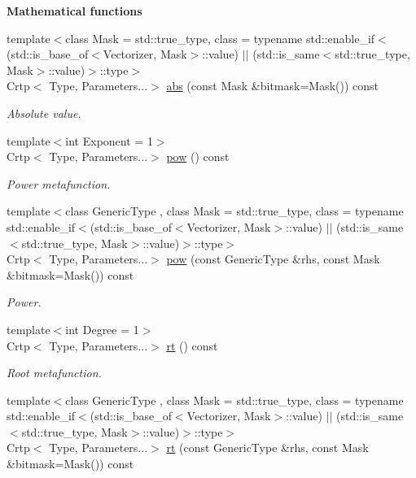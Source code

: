 \begin{Indent}{\bf Mathematical functions}\par
\begin{DoxyCompactItemize}
\item 
{\footnotesize template$<$class Mask  = std\-::true\-\_\-type, class  = typename std\-::enable\-\_\-if$<$(std\-::is\-\_\-base\-\_\-of$<$\-Vectorizer, Mask$>$\-::value) $|$$|$ (std\-::is\-\_\-same$<$std\-::true\-\_\-type, Mask$>$\-::value)$>$\-::type$>$ }\\Crtp$<$ Type, Parameters...$>$ \hyperlink{classmagrathea_1_1AbstractNArray_ac31ef0d0956a0a076f8fb47c98af4eaa}{abs} (const Mask \&bitmask=Mask()) const 
\begin{DoxyCompactList}\small\item\em Absolute value. \end{DoxyCompactList}\item 
{\footnotesize template$<$int Exponent = 1$>$ }\\Crtp$<$ Type, Parameters...$>$ \hyperlink{classmagrathea_1_1AbstractNArray_a502edc22924d0096c7929a9490174f81}{pow} () const 
\begin{DoxyCompactList}\small\item\em Power metafunction. \end{DoxyCompactList}\item 
{\footnotesize template$<$class Generic\-Type , class Mask  = std\-::true\-\_\-type, class  = typename std\-::enable\-\_\-if$<$(std\-::is\-\_\-base\-\_\-of$<$\-Vectorizer, Mask$>$\-::value) $|$$|$ (std\-::is\-\_\-same$<$std\-::true\-\_\-type, Mask$>$\-::value)$>$\-::type$>$ }\\Crtp$<$ Type, Parameters...$>$ \hyperlink{classmagrathea_1_1AbstractNArray_ad3097e7e24f9c1a2cfbaacef90da781e}{pow} (const Generic\-Type \&rhs, const Mask \&bitmask=Mask()) const 
\begin{DoxyCompactList}\small\item\em Power. \end{DoxyCompactList}\item 
{\footnotesize template$<$int Degree = 1$>$ }\\Crtp$<$ Type, Parameters...$>$ \hyperlink{classmagrathea_1_1AbstractNArray_ac09fe9cfa8c3aa117fe860ec61ed8921}{rt} () const 
\begin{DoxyCompactList}\small\item\em Root metafunction. \end{DoxyCompactList}\item 
{\footnotesize template$<$class Generic\-Type , class Mask  = std\-::true\-\_\-type, class  = typename std\-::enable\-\_\-if$<$(std\-::is\-\_\-base\-\_\-of$<$\-Vectorizer, Mask$>$\-::value) $|$$|$ (std\-::is\-\_\-same$<$std\-::true\-\_\-type, Mask$>$\-::value)$>$\-::type$>$ }\\Crtp$<$ Type, Parameters...$>$ \hyperlink{classmagrathea_1_1AbstractNArray_a164906d4dc4c247201578fe4a917a471}{rt} (const Generic\-Type \&rhs, const Mask \&bitmask=Mask()) const 

\end{DoxyCompactItemize}
\end{Indent}
